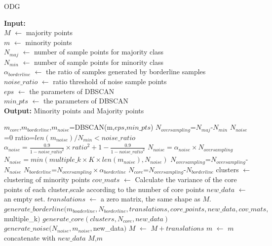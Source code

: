 \documentclass[runningheads]{llncs}
\begin{document}
\begin{algorithm}[htbp]
  \caption{ODG} %
  \label{alg1}
  \hspace*{0.02in} {\bf Input:} %
   \\$M$ $\leftarrow$ majority points  \\
   $m$ $\leftarrow$ minority points  \\
   $N_{maj}$ $\leftarrow$ number of sample points for majority class  \\
   $N_{min}$ $\leftarrow$ number of sample points for minority class  \\
   $\alpha_{borderline}$ $\leftarrow$ the ratio of samples generated by borderline samples\\
   $noise\_ratio$ $\leftarrow$  ratio threshold of noise sample points  \\
   $eps$ $\leftarrow$ the parameters of DBSCAN \\
   $min\_pts$ $\leftarrow$ the parameters of DBSCAN \\
   
  \hspace*{0.02in} {\bf Output:} %
  Minority points and Majority points

  \begin{algorithmic}[1]
  \State $m_{core}$,$m_{borderline}$,$m_{noise}$=DBSCAN(m,$eps$,$min\_pts$) %
  \State $N_{oversampling}$=$N_{maj}$-$N_{min}$
      \State $N_{noise}$=0
  \Else
      \State ratio=$len(m_{noise})/N_{min}<noise\_ratio$ 
      \State $\alpha_{noise}=\frac{0.9}{1-{noise\_{ratio}}^2}\times ratio^2+1-\frac{0.9}{1-{noise\_ratio}^2}$
      \State $N_{noise}=\alpha_{noise} \times N_{oversampling}$
      \State $N_{noise}=min(multiple\_k \times K \times len(m_{noise}), N_{noise})$
  \EndIf
  \State $N_{oversampling}$=$N_{oversampling}$-$N_{noise}$
  \State $N_{borderline}$=$N_{oversampling} \times \alpha_{borderline}$
  \State $N_{core}$=$N_{oversampling}$-$N_{borderline}$
  \State clusters $\leftarrow$ clustering of minority points
  \State $cov\_mats$ $\leftarrow$ Calculate the variance of the core points of each cluster,scale according to the number of core points
  \State $new\_data$ $\leftarrow$ an empty set.
  \State $translations$ $\leftarrow$ a zero matrix, the same shape as $M$.
  \State $generate\_borderline(m_{boaderline},N_{borderline},translations,core\_points,new\_data,cov\_mats,$multiple\_k$)$
  \State $generate\_core(clusters,N_{core},new\_data)$
  \State $generate\_noise(N_{noise},m_{noise},$new\_data$)$
  \State $M$ $\leftarrow$ $M+translations$
  \State $m$ $\leftarrow$ $m$ concatenate with $new\_data$
  \State \Return $M$,$m$
  \end{algorithmic}
  \end{algorithm}
\end{document}
